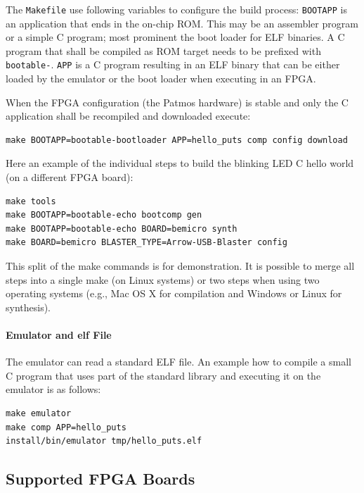 \documentclass[a4paper,fontsize=10pt,twoside,DIV15,BCOR12mm,headinclude=true,footinclude=false,pagesize,bibtotoc]{scrbook}
\newcommand{\code}[1]{{\texttt{#1}}}
\newcommand{\comment}[3]{

\textsf{\textbf{#1}} {\color{#3}#2}}
\newcommand{\martin}[1]{\comment{Martin}{#1}{Blue}}
\renewcommand{\martin}[1]{}
\begin{document}
The \code{Makefile} use following variables to configure the build process:
\code{BOOTAPP} is an application that ends in the on-chip ROM. This may
be an assembler program or a simple C program;
most prominent the boot loader for ELF binaries.
A C program that shall be compiled as ROM target needs to be prefixed
with \code{bootable-}.
\code{APP} is a C program resulting in an ELF binary that can be either
loaded by the emulator or the boot loader when executing in an FPGA.

When the FPGA configuration (the Patmos hardware) is stable and only
the C application shall be recompiled and downloaded execute:

\begin{verbatim}
make BOOTAPP=bootable-bootloader APP=hello_puts comp config download
\end{verbatim}

Here an example of the individual steps to build the blinking LED C
hello world (on a different FPGA board):
\begin{verbatim}
make tools
make BOOTAPP=bootable-echo bootcomp gen
make BOOTAPP=bootable-echo BOARD=bemicro synth
make BOARD=bemicro BLASTER_TYPE=Arrow-USB-Blaster config
\end{verbatim}

This split of the make commands is for demonstration. It is
possible to merge all steps into a single make (on Linux
systems) or two steps when using two operating
systems (e.g., Mac OS X for compilation and Windows or Linux for synthesis).

\paragraph{Emulator and elf File}

The emulator can read a standard ELF file. An example how to compile
a small C program that uses part of the standard library and executing
it on the emulator is as follows:

\begin{verbatim}
make emulator
make comp APP=hello_puts
install/bin/emulator tmp/hello_puts.elf
\end{verbatim}

\martin{Where is the make target to run the emulator with an ELF file?}

\subsection{Supported FPGA Boards}
\end{document}
